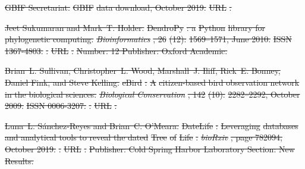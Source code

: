 \documentclass[oupdraft]{sysbio_sse}
\providecommand{\DIFdel}[1]{{\protect\color{red}\sout{#1}}}                      %
\begin{document}
\DIFdel{GBIF Secretariat.
}%
\DIFdel{GBIF}%
\DIFdel{data download, October 2019.
}%
\DIFdel{URL
  }%
\DIFdel{.
}%

\DIFdel{Jeet Sukumaran and Mark~T. Holder.
}%
\DIFdel{DendroPy}%
\DIFdel{: a }%
\DIFdel{Python}%
\DIFdel{library for phylogenetic computing.
}%
\emph{\DIFdel{Bioinformatics}}%
\DIFdel{, 26}%
\DIFdel{(12):}%
\DIFdel{1569--1571, June
  2010.
}%
\DIFdel{ISSN 1367-4803.
}%
\DIFdel{.
}%
\DIFdel{URL
  }%
\DIFdel{.
}%
\DIFdel{Number: 12 Publisher: Oxford Academic.
}%

\DIFdel{Brian~L. Sullivan, Christopher~L. Wood, Marshall~J. Iliff, Rick~E. Bonney,
  Daniel Fink, and Steve Kelling.
}%
\DIFdel{eBird}%
\DIFdel{: }%
\DIFdel{A}%
\DIFdel{citizen-based bird observation network in the biological
  sciences.
}%
\emph{\DIFdel{Biological Conservation}}%
\DIFdel{, 142}%
\DIFdel{(10):}%
\DIFdel{2282--2292, October 2009.
}%
\DIFdel{ISSN 0006-3207.
}%
\DIFdel{.
}%
\DIFdel{URL
  }%
\DIFdel{.
}%

\DIFdel{Luna~L. Sánchez-Reyes and Brian~C. O’Meara.
}%
\DIFdel{DateLife}%
\DIFdel{: }%
\DIFdel{Leveraging}%
\DIFdel{databases and analytical tools to reveal the
  dated }%
\DIFdel{Tree}%
\DIFdel{of }%
\DIFdel{Life}%
\DIFdel{.
}%
\emph{\DIFdel{bioRxiv}}%
\DIFdel{, page 782094, October 2019.
}%
\DIFdel{.
}%
\DIFdel{URL }%
\DIFdel{.
}%
\DIFdel{Publisher: Cold Spring Harbor Laboratory Section: New Results.
}%
\end{document}
